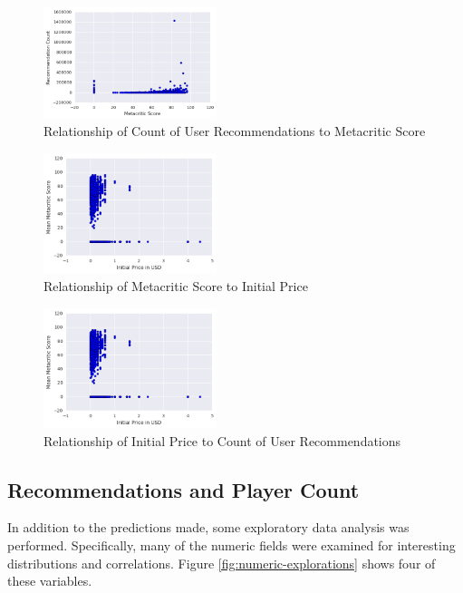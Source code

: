 \documentclass[letterpaper,10pt,twocolumn]{article}
\begin{document}
\begin{figure}[H]
    \label{fig:metacritic-recommendations}
    \caption{Relationship of Count of User Recommendations to Metacritic Score}
    \includegraphics[width=0.45\textwidth,keepaspectratio]{metacritic-recommendations-scatter}
\end{figure}

\begin{figure}[H]
    \label{fig:metacritic-price}
    \caption{Relationship of Metacritic Score to Initial Price}
    \includegraphics[width=0.45\textwidth,keepaspectratio]{price-metacritic-scatter}
\end{figure}

\begin{figure}[H]
    \label{fig:price-recommendations}
    \caption{Relationship of Initial Price to Count of User Recommendations}
    \includegraphics[width=0.45\textwidth,keepaspectratio]{price-metacritic-scatter}
\end{figure}

\subsection{Recommendations and Player Count}

In addition to the predictions made, some exploratory data analysis was performed.
Specifically, many of the numeric fields were examined for interesting distributions
and correlations. Figure \ref{fig:numeric-explorations} shows four of these variables.
\end{document}
